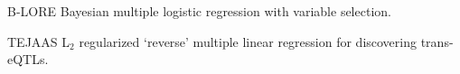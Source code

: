 


\begin{cvskills}


\cvskill
{B-LORE} %
{Bayesian multiple logistic regression with variable selection.} %


\cvskill
{TEJAAS} %
{L$_\text{2}$ regularized `reverse' multiple linear regression for discovering trans-eQTLs.} %


\end{cvskills}
